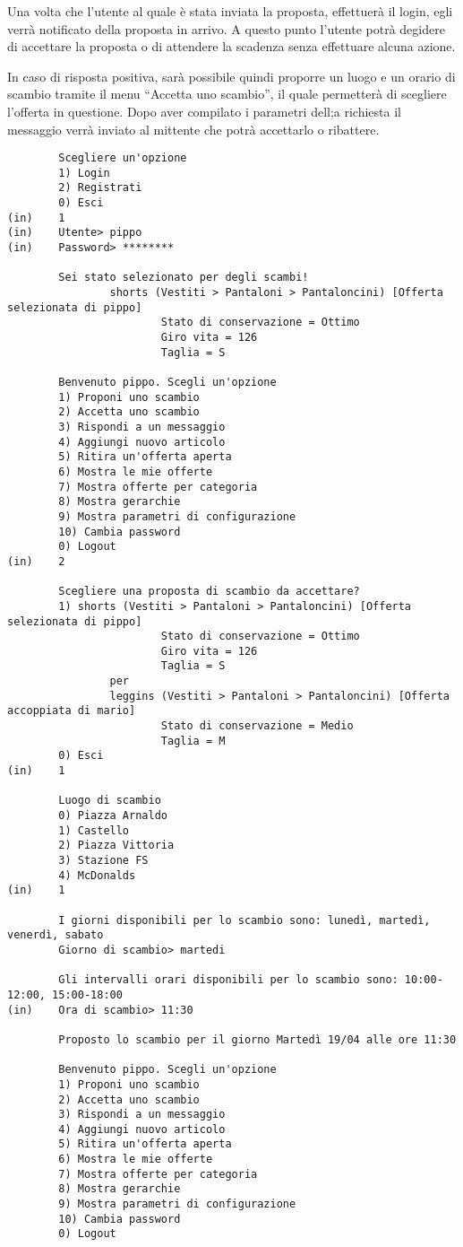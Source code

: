 Una volta che l'utente al quale è stata inviata la proposta, effettuerà il login, egli verrà notificato della proposta in arrivo. A questo punto l'utente potrà degidere di accettare la proposta o di attendere la scadenza senza effettuare alcuna azione.

In caso di risposta positiva, sarà possibile quindi proporre un luogo e un orario di scambio tramite il menu ``Accetta uno scambio'', il quale permetterà di scegliere l'offerta in questione. Dopo aver compilato i parametri dell;a richiesta il messaggio verrà inviato al mittente che potrà accettarlo o ribattere.

\begin{lstlisting}
        Scegliere un'opzione
        1) Login
        2) Registrati
        0) Esci
(in)    1
(in)    Utente> pippo
(in)    Password> ********

        Sei stato selezionato per degli scambi!
                shorts (Vestiti > Pantaloni > Pantaloncini) [Offerta selezionata di pippo]
                        Stato di conservazione = Ottimo
                        Giro vita = 126
                        Taglia = S

        Benvenuto pippo. Scegli un'opzione
        1) Proponi uno scambio
        2) Accetta uno scambio
        3) Rispondi a un messaggio
        4) Aggiungi nuovo articolo
        5) Ritira un'offerta aperta
        6) Mostra le mie offerte
        7) Mostra offerte per categoria
        8) Mostra gerarchie
        9) Mostra parametri di configurazione
        10) Cambia password
        0) Logout
(in)    2

        Scegliere una proposta di scambio da accettare?
        1) shorts (Vestiti > Pantaloni > Pantaloncini) [Offerta selezionata di pippo]
                        Stato di conservazione = Ottimo
                        Giro vita = 126
                        Taglia = S
                per
                leggins (Vestiti > Pantaloni > Pantaloncini) [Offerta accoppiata di mario]
                        Stato di conservazione = Medio
                        Taglia = M
        0) Esci
(in)    1

        Luogo di scambio
        0) Piazza Arnaldo
        1) Castello
        2) Piazza Vittoria
        3) Stazione FS
        4) McDonalds
(in)    1

        I giorni disponibili per lo scambio sono: lunedì, martedì, venerdì, sabato
        Giorno di scambio> martedi

        Gli intervalli orari disponibili per lo scambio sono: 10:00-12:00, 15:00-18:00
(in)    Ora di scambio> 11:30

        Proposto lo scambio per il giorno Martedì 19/04 alle ore 11:30

        Benvenuto pippo. Scegli un'opzione
        1) Proponi uno scambio
        2) Accetta uno scambio
        3) Rispondi a un messaggio
        4) Aggiungi nuovo articolo
        5) Ritira un'offerta aperta
        6) Mostra le mie offerte
        7) Mostra offerte per categoria
        8) Mostra gerarchie
        9) Mostra parametri di configurazione
        10) Cambia password
        0) Logout
\end{lstlisting}

